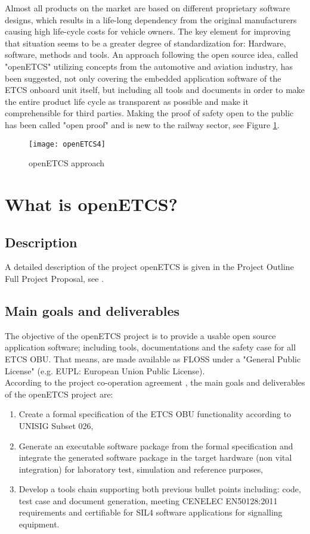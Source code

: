 \documentclass{template/openetcs_report}
\begin{document}
Almost all products on the market are based on different proprietary software designs, which results in a life-long dependency from the original manufacturers causing high life-cycle costs for vehicle owners. The key element for improving that situation seems to be a greater degree of standardization for: Hardware, software, methods and tools.
An approach following the open source idea, called "openETCS" utilizing concepts from the automotive and
aviation industry, has been suggested, not only covering the embedded application software of the ETCS onboard unit itself, but including all tools and documents in order to make the entire product life cycle as transparent as possible and make it comprehensible for third parties.
Making the proof of safety open to the public has been called "open proof" and is new to the railway sector, see Figure \ref{fig:openETCS4}.

\begin{figure}[h]
\centering
\texttt{[image: openETCS4]}
\caption{openETCS approach}
\label{fig:openETCS4}
\end{figure}


\chapter{What is openETCS?}

\section{Description}
A detailed description of the project openETCS is given in the Project Outline Full Project
Proposal, see \cite{FPP13}.

\section{Main goals and deliverables}
The objective of the openETCS project is to provide a usable open source application software; including tools, documentations and the safety case for all ETCS OBU. That means, are made available as FLOSS under a "General Public License" (e.g. EUPL: European Union Public License).
\\
According to the project co-operation agreement \cite{PCA12}, the main goals and deliverables of the openETCS project are:
\begin{enumerate}
  \item Create a formal specification of the ETCS OBU functionality according to UNISIG Subset 026,
  \item Generate an executable software package from the formal specification and integrate the generated software package in the target hardware (non vital integration) for laboratory test, simulation and reference purposes,  
  \item Develop a tools chain supporting both previous bullet points including: code, test case and document generation, meeting CENELEC EN50128:2011 requirements and certifiable for SIL4 software applications for signalling equipment.
\end{enumerate}
\end{document}
